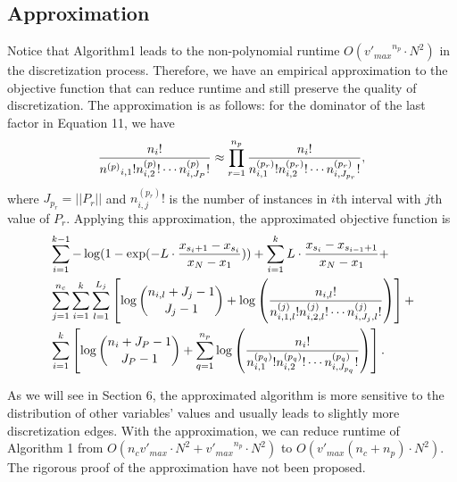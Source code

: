 \subsection{Approximation}
\label{approx}
Notice that Algorithm1 leads to the non-polynomial runtime $O({v'_{max}}^{n_p} \cdot N^2)$ in the discretization process. Therefore, we have an empirical approximation to the objective function that can reduce runtime and still preserve the quality of discretization. The approximation is as follows: for the dominator of the last factor in Equation 11, we have
\begin{equation}
{{{{n}_i}!}\over{ {{n^{(p)}}_{i,1} !} {n^{(p)}_{i,2} !} \cdots {n^{(p)}_{i,J_P} !}}} \approx \prod_{r=1}^{n_p} { {{{n}_i}!}\over{ {n^{(p_r)}_{i,1} !} {n^{(p_r)}_{i,2} !} \cdots {n^{(p_r)}_{i,J_{p_r}} !}}},
\end{equation}
where $J_{p_r} = || P_r||$ and ${n^{(p_r)}_{i,j} !}$ is the number of instances in $i$th interval with $j$th value of $P_r$. Applying this approximation, the approximated objective function is
\begin{equation}
\begin{aligned}
& \sum_{i=1}^{k-1} - \log(1 - {\exp(- L \cdot {{x_{s_i+1} - x_{s_i}}\over{x_N - x_1}})}) +  \sum_{i=1}^{k} L \cdot {{x_{s_{i}} - x_{s_{i-1} + 1}}\over{x_N - x_1}} +\\
&  \sum_{j=1}^{n_c} \sum_{i=1}^{k}  \sum_{l=1}^{L_j} \left[  \log{{n_{i,l} + J_j - 1}\choose{J_j-1}} + \log \left( { {{n_{i,l}}!}\over{ {n^{(j)}_{i,1,l} !} {n^{(j)}_{i,2,l} !} \cdots {n^{(j)}_{i,J_j,l} !}} } \right) \right] + \\
& \sum_{i=1}^k \left[  \log {{n_{i} + J_P - 1}\choose{J_P-1}} + \sum_{q=1}^{n_p} \log \left( { {{{n}_i}!}\over{ {n^{(p_q)}_{i,1} !} {n^{(p_q)}_{i,2} !} \cdots {n^{(p_q)}_{i,J_{p_q}} !}}} \right) \right].
\end{aligned}
\end{equation}


As we will see in Section 6, the approximated algorithm is more sensitive to the distribution of other variables' values and usually leads to slightly more discretization edges. With the approximation, we can reduce runtime of Algorithm 1 from $O(n_c  {v'_{max}} \cdot N^2 + {v'_{max}}^{n_p} \cdot N^2)$ to $O( {v'_{max}} (n_c + n_p) \cdot N^2)$. The rigorous proof of the approximation have not been proposed.

